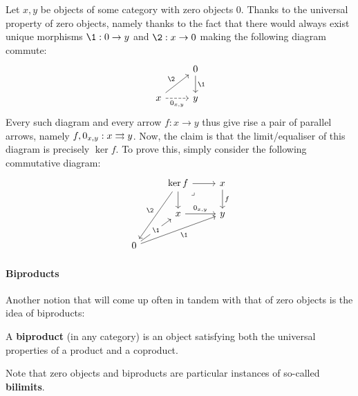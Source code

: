                 \begin{remark} \label{remark: (co)kernels_as_(co)equalisers}
                    Let $x, y$ be objects of some category with zero objects $0$. Thanks to the universal property of zero objects, namely thanks to the fact that there would always exist unique morphisms $\1: 0 \to y$ and $\2: x \to 0$ making the following diagram commute:
                        $$
                            \begin{tikzcd}
                            	{} & 0 \\
                            	x & y
                            	\arrow["{0_{x, y}}"', from=2-1, to=2-2, dashed]
                            	\arrow["\1", from=1-2, to=2-2]
                            	\arrow["\2", from=2-1, to=1-2]
                            \end{tikzcd}
                        $$
                    Every such diagram and every arrow $f: x \to y$ thus give rise a pair of parallel arrows, namely $f, 0_{x, y}: x \rightrightarrows y$. Now, the claim is that the limit/equaliser of this diagram is precisely $\ker f$. To prove this, simply consider the following commutative diagram:
                        $$
                            \begin{tikzcd}
                            	& {\ker f} & x \\
                            	& x & y \\
                            	0
                            	\arrow["f", from=1-3, to=2-3]
                            	\arrow[from=1-2, to=1-3]
                            	\arrow["\lrcorner"{anchor=center, pos=0.125}, draw=none, from=1-2, to=2-3]
                            	\arrow["{0_{x, y}}", from=2-2, to=2-3]
                            	\arrow[from=1-2, to=2-2]
                            	\arrow["\1"{description}, from=3-1, to=2-2]
                            	\arrow["\1"', from=3-1, to=2-3]
                            	\arrow["\2"', from=1-2, to=3-1]
                            \end{tikzcd}
                        $$
                \end{remark}
            
            \paragraph{Biproducts}
                Another notion that will come up often in tandem with that of zero objects is the idea of biproducts:
                \begin{definition}[Biproducts] \label{def: biproducts} 
                    A \textbf{biproduct} (in any category) is an object satisfying both the universal properties of a product and a coproduct.
                \end{definition}
                \begin{remark}
                    Note that zero objects and biproducts are particular instances of so-called \textbf{bilimits}. 
                \end{remark}
                
